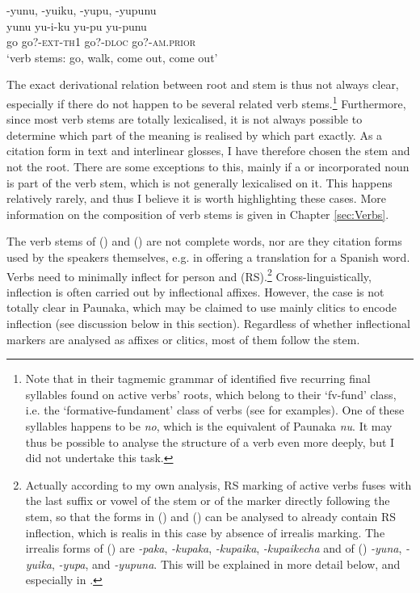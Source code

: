\ea\label{ex:VerbStems-2}
\begingl
\glpreamble -yunu, -yuiku, -yupu, -yupunu\\
\gla yunu yu-i-ku yu-pu yu-punu\\
\glb go go?-\textsc{ext}-\textsc{th}1 go?-\textsc{dloc} go?-\textsc{am.prior}\\
\glft ‘verb stems: go, walk, come out, come out’
\endgl
\xe
{}

The exact derivational relation between root and stem is thus not always clear, especially if there do not happen to be several related verb stems.\footnote{Note that \citet[]{BaptistaWallin1965} in their tagmemic grammar of  identified five recurring final syllables found on active verbs’ roots, which belong to their ‘fv-fund’ class, i.e. the ‘formative-fundament’ class of verbs (see \citealt[42, 49-50]{BaptistaWallin1965} for examples). One of these syllables happens to be \textit{no}, which is the  equivalent of Paunaka \textit{nu}. It may thus be possible to analyse the structure of a verb even more deeply, but I did not undertake this task.} Furthermore, since most verb stems are totally lexicalised, it is not always possible to determine which part of the meaning is realised by which part exactly. As a citation form in text and interlinear glosses, I have therefore chosen the stem and not the root. There are some exceptions to this, mainly if a  or incorporated noun is part of the verb stem, which is not generally lexicalised on it. This happens relatively rarely, and thus I believe it is worth highlighting these cases. More information on the composition of verb stems is given in Chapter \ref{sec:Verbs}.

The verb stems of () and () are not complete words, nor are they citation forms used by the speakers themselves, e.g. in offering a translation for a Spanish word. Verbs need to minimally inflect for person and  (RS).\footnote{Actually according to my own analysis, RS marking of active verbs fuses with the last suffix or vowel of the stem or of the marker directly following the stem, so that the forms in () and () can be analysed to already contain RS inflection, which is realis in this case by absence of irrealis marking. The irrealis forms of () are \textit{-paka}, \textit{-kupaka}, \textit{-kupaika}, \textit{-kupaikecha} and of  () \textit{-yuna}, \textit{-yuika}, \textit{-yupa}, and \textit{-yupuna}. This will be explained in more detail below, and especially in .} Cross-linguistically, inflection is often carried out by inflectional affixes. However, the case is not totally clear in Paunaka, which may be claimed to use mainly clitics to encode inflection (see discussion below in this section). Regardless of whether inflectional markers are analysed as affixes or clitics, most of them follow the stem. 

